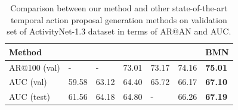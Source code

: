 \documentclass[10pt,twocolumn,letterpaper]{article}
\begin{document}
\begin{table}[tbp]
\centering
\caption{ Comparison between our method and other state-of-the-art temporal action proposal generation methods on validation set of  ActivityNet-1.3 dataset in terms of AR@AN and AUC. }
\small
\begin{tabular}{m{1.9cm}m{0.55cm}<{\centering}m{0.55cm}<{\centering}m{0.55cm}<{\centering}m{0.55cm}<{\centering}m{0.55cm}<{\centering}m{0.55cm}<{\centering}}
\toprule
Method  &  \cite{dai2017temporal}   &  \cite{ghanem2017activitynet} & \cite{lin2017temporal}  & \cite{gao2018ctap} &  \cite{lin2018bsn} & BMN \\
\hline 
AR@100 (val)	& -		& - 	& 73.01	& 73.17 & 74.16 & {\bf 75.01}  \\
AUC (val) 		& 59.58 & 63.12 & 64.40 & 65.72	& 66.17 & {\bf 67.10} \\
AUC (test) 		& 61.56	& 64.18 & 64.80 & - 	& 66.26 & {\bf 67.19}  \\
\bottomrule
\end{tabular}
\label{table:proposal_anet}
\end{table}
\end{document}

